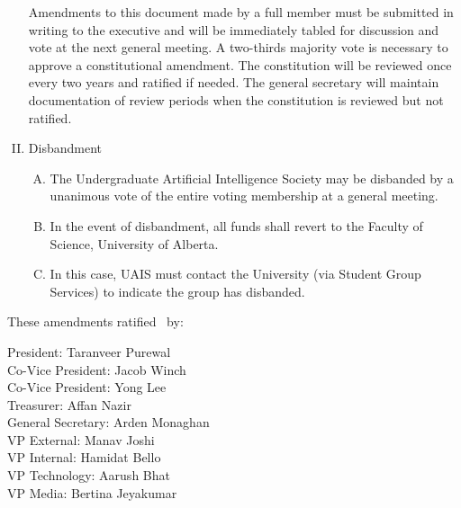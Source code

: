 \documentclass[11pt]{article}
\begin{document}
\begin{enumerate}[I.]
    Amendments to this document made by a full member must be submitted in
    writing to the executive and will be immediately tabled for discussion and vote at the next general meeting. A two-thirds majority vote is necessary to approve a constitutional amendment. The constitution will be reviewed once every two years and ratified if needed. The general secretary will maintain documentation of review periods when the constitution is reviewed but not ratified.
  \item Disbandment
    \begin{enumerate}[A)]
      \item The Undergraduate Artificial Intelligence Society may be disbanded by a unanimous vote of the entire voting membership at a general meeting.
      \item  In the event of disbandment, all funds shall revert to the Faculty of Science, University of Alberta.
      \item In this case, UAIS must contact the University (via Student Group Services) to indicate the group has disbanded.
    \end{enumerate}
\end{enumerate}

These amendments ratified \thedate\ by:

President: Taranveer Purewal \\
Co-Vice President: Jacob Winch \\
Co-Vice President: Yong Lee \\
Treasurer: Affan Nazir \\
General Secretary: Arden Monaghan \\
VP External: Manav Joshi \\
VP Internal: Hamidat Bello \\
VP Technology: Aarush Bhat \\
VP Media: Bertina Jeyakumar \\
\end{document}
